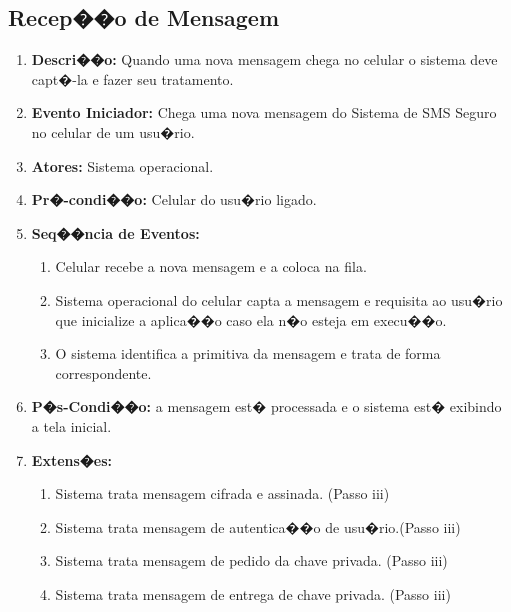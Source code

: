 \documentclass[a4paper,capchap,espacoduplo,normaltoc]{abntepusp}
\begin{document}
\subsection{Recep��o de Mensagem}
	\begin{enumerate}
	\item \textbf{Descri��o:} Quando uma nova mensagem chega no celular o sistema deve capt�-la e fazer seu tratamento.
	\item \textbf{Evento Iniciador:} Chega uma nova mensagem do Sistema de SMS Seguro no celular de um usu�rio.
	\item \textbf{Atores:} Sistema operacional.
	\item \textbf{Pr�-condi��o:} Celular do usu�rio ligado.
	\item \textbf{Seq��ncia de Eventos:}
	\begin{enumerate}
	\item Celular recebe a nova mensagem e a coloca na fila.
	\item	Sistema operacional do celular capta a mensagem e requisita ao usu�rio que inicialize a aplica��o caso ela n�o esteja em execu��o.
	\item	O sistema identifica a primitiva da mensagem e trata de forma correspondente.
	\end{enumerate}
	\item \textbf{P�s-Condi��o:} a mensagem est� processada e o sistema est� exibindo a tela inicial.
	\item \textbf{Extens�es:} 
	\begin{enumerate}
	\item	Sistema trata mensagem cifrada e assinada. (Passo iii)
	\item	Sistema trata mensagem de autentica��o de usu�rio.(Passo iii)
	\item	Sistema trata mensagem de pedido da chave privada. (Passo iii)
	\item	Sistema trata mensagem de entrega de chave privada. (Passo iii)
	\end{enumerate}
\end{enumerate}
\end{document}
